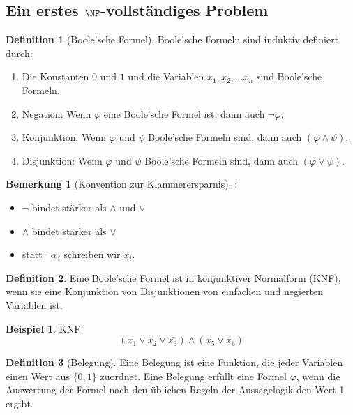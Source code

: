 \documentclass[11pt]{article} %
\theoremstyle{definition}
\newtheorem*{beispiel}{Beispiel}
\newtheorem{definition}{Definition}
\newtheorem*{bemerkung}{Bemerkung}
\begin{document}
\subsection{Ein erstes $\NP$-vollständiges Problem}

\begin{definition}[Boole'sche Formel]
Boole'sche Formeln sind induktiv definiert durch:
\begin{enumerate}
\item Die Konstanten $0$ und $1$ und die Variablen $x_1, x_2, \dots x_n$ sind Boole'sche Formeln.
\item Negation: Wenn $\varphi$ eine Boole'sche Formel ist, dann auch $\neg \varphi$.
\item Konjunktion: Wenn $\varphi$ und $\psi$ Boole'sche Formeln sind, dann auch $(\varphi \land \psi)$.
\item Disjunktion: Wenn $\varphi$ und $\psi$ Boole'sche Formeln sind, dann auch $(\varphi \lor \psi)$.
\end{enumerate}
\end{definition}

\begin{bemerkung}[Konvention zur Klammerersparnis] :
\begin{itemize}
\item $\neg$ bindet stärker als $\land$ und $\lor$
\item $\land$ bindet stärker als $\lor$
\item statt $\neg x_i$ schreiben wir $\bar{x_i}$.
\end{itemize}
\end{bemerkung}

\begin{definition}
Eine Boole'sche Formel ist in konjunktiver Normalform (KNF), wenn sie eine Konjunktion von Disjunktionen von einfachen und negierten Variablen ist.
\end{definition}

\begin{beispiel} KNF:
\[
(x_1 \lor x_2 \lor \bar{x_3}) \land  (x_5 \lor x_6)
\]

\end{beispiel}

\begin{definition}[Belegung]

Eine Belegung ist eine Funktion, die jeder Variablen einen Wert aus $\{0,1\}$ zuordnet. Eine Belegung erfüllt eine Formel $\varphi$, wenn die Auswertung der Formel nach den üblichen Regeln der Aussagelogik den Wert 1 ergibt.
\end{definition}
\end{document}
